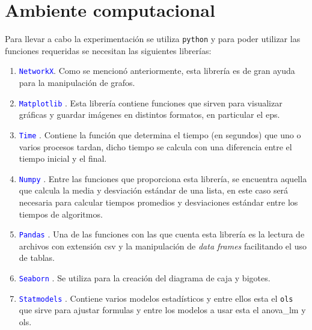 \documentclass[12pt]{article}
\begin{document}
\newpage
\section{Ambiente computacional}

Para llevar a cabo la experimentación se utiliza \texttt{python} \cite{Python} y para poder utilizar las funciones requeridas se necesitan las siguientes librerías:

\begin{enumerate}
\item \textcolor{blue}{\texttt{NetworkX}}. Como se mencionó anteriormente, esta librería es de gran ayuda para la manipulación de grafos.

\item \textcolor{blue}{\texttt{Matplotlib}} \cite{Mat}. Esta librería contiene funciones que sirven para visualizar gráficas y guardar imágenes en distintos formatos, en particular el eps.
 
\item \textcolor{blue}{\texttt{Time}} \cite{PythonHow}. Contiene la función que determina el tiempo (en segundos) que uno o varios procesos tardan, dicho tiempo se calcula con una diferencia entre el tiempo inicial y el final.

\item \textcolor{blue}{\texttt{Numpy}} \cite{Num}. Entre las funciones que proporciona esta librería, se encuentra aquella que calcula la media y desviación estándar de una lista, en este caso será necesaria para calcular tiempos promedios y desviaciones estándar entre los tiempos de algoritmos. 

\item \textcolor{blue}{\texttt{Pandas}} \cite{Pd}. Una de las funciones con las que cuenta esta librería es la lectura de archivos con extensión csv y la manipulación de \textit{data frames} facilitando el uso de tablas.

\item \textcolor{blue}{\texttt{Seaborn}} \cite{sns}. Se utiliza para la creación del diagrama de caja y bigotes.

\item \textcolor{blue}{\texttt{Statmodels}} \cite{stm}. Contiene varios modelos estadísticos y entre ellos esta el \texttt{ols} que sirve para ajustar formulas y entre los modelos a usar esta el anova\_lm y ols. 

\end{enumerate}

 \label{c4}

\end{document}
